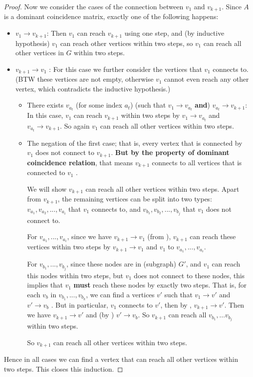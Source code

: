 \begin{proof}
Now we consider the cases of the connection between \(v_1\) and \(v_{k + 1}\).
Since \(A\) is a dominant coincidence matrix, exactly one of the following happens:
\begin{itemize}
\item \(v_1 \to v_{k + 1}\):
    Then \(v_1\) can reach \(v_{k + 1}\) using one step, and (by inductive hypothesis) \(v_1\) can reach other vertices within two steps, so \(v_1\) can reach all other vertices in \(G\) within two steps.
\item \(v_{k + 1} \to v_1\) :
    For this case we further consider the vertices that \(v_1\) connects to.
    (BTW these vertices are not empty, otherwise \(v_1\) cannot even reach any other vertex, which contradicts the inductive hypothesis.)
    \begin{itemize}
    \item There exists \(v_{a_t}\) (for some index \(a_t\)) (such that \(v_1 \to v_{a_t}\) \textbf{and}) \(v_{a_t} \to v_{k + 1}\):
        In this case, \(v_1\) can reach \(v_{k + 1}\) within two steps by \(v_1 \to v_{a_t}\) and \(v_{a_t} \to v_{k + 1}\).
        So again \(v_1\) can reach all other vertices within two steps.
    \item The negation of the first case; that is, every vertex that is connected by \(v_1\) does not connect to \(v_{k + 1}\).
        \textbf{But by the property of dominant coincidence relation}, that means \(v_{k + 1}\) connects to all vertices that is connected to \(v_1\) .
        
        We will show \(v_{k + 1}\) can reach all other vertices within two steps.
        Apart from \(v_{k + 1}\), the remaining vertices can be split into two types: \(v_{a_1}, v_{a_2}, ..., v_{a_i}\) that \(v_1\) connects to, and \(v_{b_1}, v_{b_2}, ..., v_{b_j}\) that \(v_1\) does not connect to.
        
        For \(v_{a_1}, ..., v_{a_i}\), since we have \(v_{k + 1} \to v_1\) (from ), \(v_{k + 1}\) can reach these vertices within two steps by \(v_{k + 1} \to v_1\) and \(v_1\) to \(v_{a_1}, ..., v_{a_i}\).
        
        For \(v_{b_1}, ..., v_{b_j}\), since these nodes are in (subgraph) \(G'\), and \(v_1\) can reach this nodes within two steps, but \(v_1\) does not connect to these nodes, this implies that \(v_1\) \textbf{must} reach these nodes by exactly two steps.
        That is, for each \(v_b\) in \(v_{b_1}, ..., v_{b_k}\), we can find a vertices \(v'\) such that \(v_1 \to v'\) and \(v' \to v_b\) .
        But in particular, \(v_1\) connects to \(v'\), then by , \(v_{k + 1} \to v'\).
        Then we have \(v_{k + 1} \to v'\) and (by ) \(v' \to v_b\).
        So \(v_{k + 1}\) can reach all \(v_{b_1}, ... v_{b_j}\) within two steps.
        
        So \(v_{k + 1}\) can reach all other vertices within two steps.
    \end{itemize}
\end{itemize}
Hence in all cases we can find a vertex that can reach all other vertices within two steps.
This closes this induction.
\end{proof}

